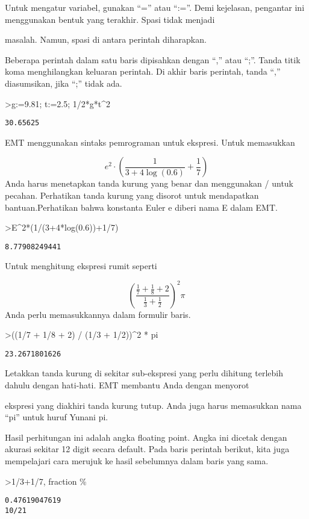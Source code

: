 \documentclass[
]{book}
\begin{document}
Untuk mengatur variabel, gunakan ``='' atau ``:=''. Demi kejelasan, pengantar ini menggunakan bentuk yang terakhir. Spasi tidak menjadi

masalah. Namun, spasi di antara perintah diharapkan.

Beberapa perintah dalam satu baris dipisahkan dengan ``,'' atau ``;''. Tanda titik koma menghilangkan keluaran perintah. Di akhir baris perintah, tanda ``,'' diasumsikan, jika ``;'' tidak ada.

\textgreater g:=9.81; t:=2.5; 1/2*g*t\^{}2

\begin{verbatim}
30.65625
\end{verbatim}

EMT menggunakan sintaks pemrograman untuk ekspresi. Untuk memasukkan

\[e^2 \cdot \left( \frac{1}{3+4 \log(0.6)}+\frac{1}{7} \right)\]Anda harus menetapkan tanda kurung yang benar dan menggunakan / untuk pecahan. Perhatikan tanda kurung yang disorot untuk mendapatkan bantuan.Perhatikan bahwa konstanta Euler e diberi nama E dalam EMT.

\textgreater E\^{}2*(1/(3+4*log(0.6))+1/7)

\begin{verbatim}
8.77908249441
\end{verbatim}

Untuk menghitung ekspresi rumit seperti

\[\left(\frac{\frac17 + \frac18 + 2}{\frac13 + \frac12}\right)^2 \pi\]Anda perlu memasukkannya dalam formulir baris.

\textgreater((1/7 + 1/8 + 2) / (1/3 + 1/2))\^{}2 * pi

\begin{verbatim}
23.2671801626
\end{verbatim}

Letakkan tanda kurung di sekitar sub-ekspresi yang perlu dihitung terlebih dahulu dengan hati-hati. EMT membantu Anda dengan menyorot

ekspresi yang diakhiri tanda kurung tutup. Anda juga harus memasukkan nama ``pi'' untuk huruf Yunani pi.

Hasil perhitungan ini adalah angka floating point. Angka ini dicetak dengan akurasi sekitar 12 digit secara default. Pada baris perintah berikut, kita juga mempelajari cara merujuk ke hasil sebelumnya dalam baris yang sama.

\textgreater1/3+1/7, fraction \%

\begin{verbatim}
0.47619047619
10/21
\end{verbatim}
\end{document}
